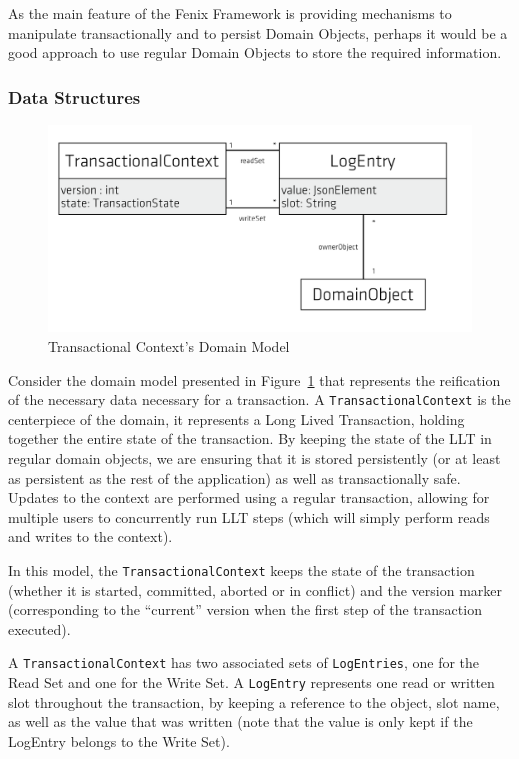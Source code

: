 \documentclass{llncs}
\begin{document}
As the main feature of the Fenix Framework is providing mechanisms to
manipulate transactionally and to persist Domain Objects, perhaps it
would be a good approach to use regular Domain Objects to store the
required information.

\subsubsection{Data Structures}

\begin{figure}
\centering
\includegraphics[width=0.5\linewidth]{tx-context}
\caption{Transactional Context's Domain Model}
\label{fig:transactionalContext}
\end{figure}

Consider the domain model presented in
Figure~\ref{fig:transactionalContext} that represents the reification
of the necessary data necessary for a transaction. A
\texttt{TransactionalContext} is the centerpiece of the domain, it
represents a Long Lived Transaction, holding together the entire state
of the transaction. By keeping the state of the LLT in regular domain
objects, we are ensuring that it is stored persistently (or at least
as persistent as the rest of the application) as well as
transactionally safe. Updates to the context are performed using a
regular transaction, allowing for multiple users to concurrently run
LLT steps (which will simply perform reads and writes to the context).

In this model, the \texttt{TransactionalContext} keeps the state of
the transaction (whether it is started, committed, aborted or in
conflict) and the version marker (corresponding to the ``current''
version when the first step of the transaction executed).

A \texttt{TransactionalContext} has two associated sets of
\texttt{LogEntries}, one for the Read Set and one for the Write Set. A
\texttt{LogEntry} represents one read or written slot throughout the
transaction, by keeping a reference to the object, slot name, as well
as the value that was written (note that the value is only kept if the
LogEntry belongs to the Write Set).
\end{document}
